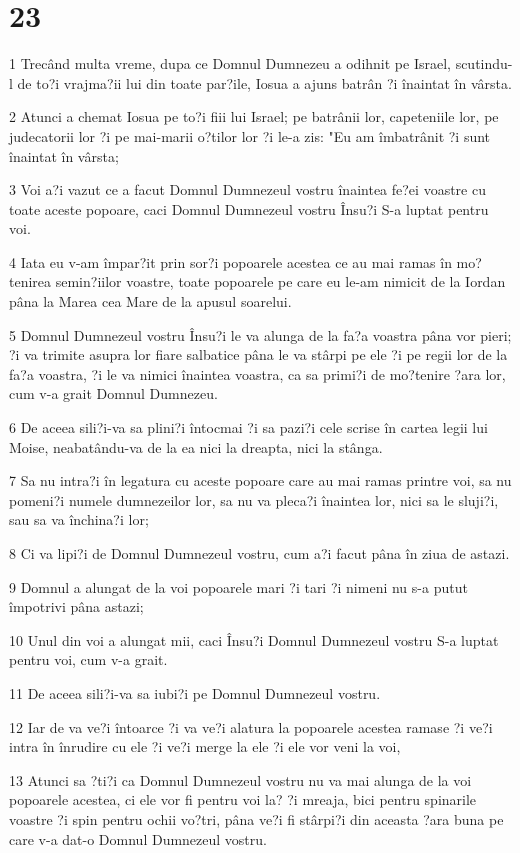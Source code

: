 \chapter{23}

\par 1 Trecând multa vreme, dupa ce Domnul Dumnezeu a odihnit pe Israel, scutindu-l de to?i vrajma?ii lui din toate par?ile, Iosua a ajuns batrân ?i înaintat în vârsta.
\par 2 Atunci a chemat Iosua pe to?i fiii lui Israel; pe batrânii lor, capeteniile lor, pe judecatorii lor ?i pe mai-marii o?tilor lor ?i le-a zis: "Eu am îmbatrânit ?i sunt înaintat în vârsta;
\par 3 Voi a?i vazut ce a facut Domnul Dumnezeul vostru înaintea fe?ei voastre cu toate aceste popoare, caci Domnul Dumnezeul vostru Însu?i S-a luptat pentru voi.
\par 4 Iata eu v-am împar?it prin sor?i popoarele acestea ce au mai ramas în mo?tenirea semin?iilor voastre, toate popoarele pe care eu le-am nimicit de la Iordan pâna la Marea cea Mare de la apusul soarelui.
\par 5 Domnul Dumnezeul vostru Însu?i le va alunga de la fa?a voastra pâna vor pieri; ?i va trimite asupra lor fiare salbatice pâna le va stârpi pe ele ?i pe regii lor de la fa?a voastra, ?i le va nimici înaintea voastra, ca sa primi?i de mo?tenire ?ara lor, cum v-a grait Domnul Dumnezeu.
\par 6 De aceea sili?i-va sa plini?i întocmai ?i sa pazi?i cele scrise în cartea legii lui Moise, neabatându-va de la ea nici la dreapta, nici la stânga.
\par 7 Sa nu intra?i în legatura cu aceste popoare care au mai ramas printre voi, sa nu pomeni?i numele dumnezeilor lor, sa nu va pleca?i înaintea lor, nici sa le sluji?i, sau sa va închina?i lor;
\par 8 Ci va lipi?i de Domnul Dumnezeul vostru, cum a?i facut pâna în ziua de astazi.
\par 9 Domnul a alungat de la voi popoarele mari ?i tari ?i nimeni nu s-a putut împotrivi pâna astazi;
\par 10 Unul din voi a alungat mii, caci Însu?i Domnul Dumnezeul vostru S-a luptat pentru voi, cum v-a grait.
\par 11 De aceea sili?i-va sa iubi?i pe Domnul Dumnezeul vostru.
\par 12 Iar de va ve?i întoarce ?i va ve?i alatura la popoarele acestea ramase ?i ve?i intra în înrudire cu ele ?i ve?i merge la ele ?i ele vor veni la voi,
\par 13 Atunci sa ?ti?i ca Domnul Dumnezeul vostru nu va mai alunga de la voi popoarele acestea, ci ele vor fi pentru voi la? ?i mreaja, bici pentru spinarile voastre ?i spin pentru ochii vo?tri, pâna ve?i fi stârpi?i din aceasta ?ara buna pe care v-a dat-o Domnul Dumnezeul vostru.
